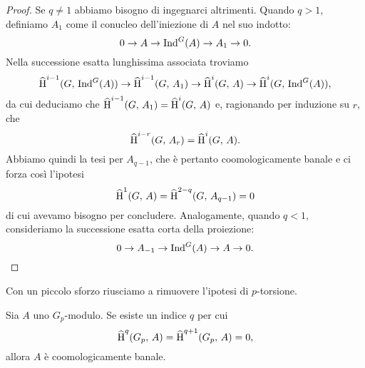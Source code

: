 \begin{proof}
	Se $ q \neq 1 $ abbiamo bisogno di ingegnarci altrimenti. Quando $ q > 1 $, definiamo $ A_1 $ come il conucleo dell'iniezione di $ A $ nel suo indotto:
	\[ 0 \to A \to \operatorname{Ind}^G(A) \to A_1 \to 0. \]
	Nella successione esatta lunghissima associata troviamo
	\[ \operatorname{\widehat{H}}^{i-1}(G, \, \operatorname{Ind}^G(A)) \to \operatorname{\widehat{H}}^{i-1}(G, \, A_1) \to \operatorname{\widehat{H}}^{i}(G, \, A) \to \operatorname{\widehat{H}}^{i}(G, \, \operatorname{Ind}^G(A)),  \]
	da cui deduciamo che $ \operatorname{\widehat{H}}^{i-1}(G, \, A_1) = \operatorname{\widehat{H}}^{i}(G, \, A) $ e, ragionando per induzione su $ r $, che
	\[ \operatorname{\widehat{H}}^{i-r}(G, \, A_r) = \operatorname{\widehat{H}}^{i}(G, \, A). \] 
	Abbiamo quindi la tesi per $ A_{q-1} $, che è pertanto coomologicamente banale e ci forza così l'ipotesi 
	\[ \operatorname{\widehat{H}}^1(G, \, A) = \operatorname{\widehat{H}}^{2-q}(G, \, A_{q-1}) = 0 \]
	di cui avevamo bisogno per concludere.
	Analogamente, quando $ q < 1 $, consideriamo la successione esatta corta della proiezione:
	\[ 0 \to A_{-1} \to \operatorname{Ind}^G(A) \to A \to 0. \]
\end{proof}

Con un piccolo sforzo riusciamo a rimuovere l'ipotesi di $ p $-torsione.

\begin{theorem}
	Sia $ A $ uno $ G_p $-modulo. Se esiste un indice $ q $ per cui
	\[ \operatorname{\widehat{H}}^q(G_p, \, A) = \operatorname{\widehat{H}}^{q+1}(G_p, \, A) = 0, \]
	allora $ A $ è coomologicamente banale.
\end{theorem}

